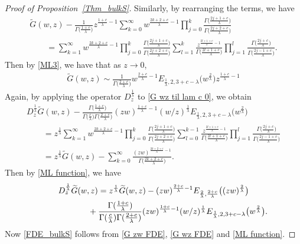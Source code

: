 \documentclass[11pt]{article}
\numberwithin{equation}{section}
\numberwithin{equation}{section}
\newcommand{\1}{\chi}
\begin{document}
\begin{proof}[Proof of Proposition~\ref{Thm_bulkS}]
	Similarly, by rearranging the terms, we have
	\begin{gather}
 \widetilde{G}(w,z)-\frac{ 1 }{\Gamma\big( \frac{1+c}{\lambda}\big)} z^{ \frac{1+c}{\lambda}-1 } \sum_{k=0}^{\infty} w^{ \frac{2k+2+c}{\lambda}-1 } \prod_{j=0}^k \frac{ \Gamma\big( \frac{2j+1+c}{\lambda} \big) }{\Gamma\big( \frac{2j+2+c}{\lambda} \big)}
			\nonumber\\
\qquad{} =\sum_{k=1}^{\infty} w^{ \frac{2k+2+c}{\lambda}-1 } \prod_{j=0}^k \frac{ \Gamma\big( \frac{2j+1+c}{\lambda} \big) }{\Gamma\big( \frac{2j+2+c}{\lambda} \big)} \sum_{l=1}^{k} \frac{ z^{ \frac{2l+1+c}{\lambda}-1 } }{\Gamma\big( \frac{2l+1+c}{\lambda} \big)} \prod_{j=1}^l \frac{\Gamma\big(\frac{2j+c}{\lambda}\big) }{ \Gamma\big( \frac{2j-1+c}{\lambda} \big) } .\label{G wz til lam c 0}
		\end{gather}
	Then by \eqref{ML3}, we have that as $z\to 0$,
	\begin{gather*} %
		\widetilde{G}(w,z)\sim \frac{1 }{ \Gamma\big( \frac{2+c}{\lambda}\big) } w^{ \frac{2+c}{\lambda}-1 } E_{\frac{1}{\lambda},2,3+c-\lambda}\big(w^{\frac{2}{\lambda}}\big) z^{ \frac{1+c}{\lambda}-1 }
	\end{gather*}
	Again, by applying the operator $D_z^{ \frac{1}{\lambda} }$ to \eqref{G wz til lam c 0}, we obtain
	\begin{gather*}
D_z^{ \frac{1}{\lambda} } \widetilde{G}(w,z)-\frac{ \Gamma\big(\frac{1+c}{\lambda}\big) }{\Gamma\big( \frac{c}{\lambda}\big) \Gamma\big( \frac{2+c}{\lambda}\big) } (zw)^{ \frac{1+c}{\lambda}-1 }(w/z)^{\frac{1}{\lambda}} E_{\frac{1}{\lambda},2,3+c-\lambda}\big(w^{\frac{2}{\lambda}}\big)\\
\qquad{} = z^{ \frac{1}{\lambda} } \sum_{k=1}^{\infty} w^{ \frac{2k+2+c}{\lambda}-1 } \prod_{j=0}^k \frac{ \Gamma\big( \frac{2j+1+c}{\lambda} \big) }{\Gamma\big( \frac{2j+2+c}{\lambda} \big)} \sum_{l=0}^{k-1} \frac{ z^{ \frac{2l+1+c}{\lambda}-1 } }{\Gamma\big( \frac{2l+1+c}{\lambda} \big)} \prod_{j=1}^l \frac{\Gamma\big(\frac{2j+c}{\lambda}\big) }{ \Gamma\big( \frac{2j-1+c}{\lambda} \big) }
		\\
\qquad{} = z^{ \frac{1}{\lambda} } \widetilde{G}(w,z)- \sum_{k=0}^{\infty} \frac{(zw)^{ \frac{2k+2+c}{\lambda}-1 }}{\Gamma\big( \frac{2k+2+c}{\lambda} \big)}.
	\end{gather*}
	Then by \eqref{ML function}, we have
	\begin{gather}
D_z^{ \frac{1}{\lambda} } \widetilde{G}(w,z)= z^{ \frac{1}{\lambda} } \widetilde{G}(w,z) -(zw)^{\frac{2+c}{\lambda}-1} E_{\frac{2}{\lambda},\frac{2+c}{\lambda}} \big((zw)^{\frac{2}{\lambda}}\big) \nonumber\\
\hphantom{D_z^{ \frac{1}{\lambda} } \widetilde{G}(w,z)=}{}
+\frac{ \Gamma(\frac{1+c}{\lambda}) }{\Gamma( \frac{c}{\lambda}) \Gamma( \frac{2+c}{\lambda}) } (zw)^{ \frac{1+c}{\lambda}-1 }(w/z)^{\frac{1}{\lambda}} E_{\frac{1}{\lambda},2,3+c-\lambda}\big(w^{\frac{2}{\lambda}}\big) . \label{G wz FDE}
		\end{gather}
	Now \eqref{FDE_bulkS} follows from \eqref{G zw FDE}, \eqref{G wz FDE} and \eqref{ML function}.
\end{proof}
\end{document}
